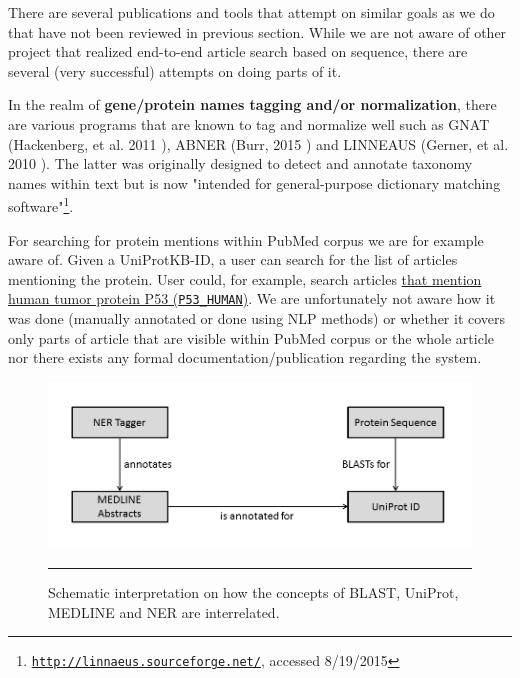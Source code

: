 There are several publications and tools that attempt on similar goals as we do that have not been reviewed in previous section. While we are not aware of other project that realized end-to-end article search based on sequence, there are several (very successful) attempts on doing parts of it.

In the realm of \textbf{gene/protein names tagging and/or normalization}, there are various programs that are known to tag and normalize well such as GNAT (Hackenberg, et al. 2011 \citep{hakenberg2011gnat}), ABNER (Burr, 2015 \citep{settles2005abner}) and LINNEAUS (Gerner, et al. 2010 \citep{gerner2010linnaeus}). The latter was originally designed to detect and annotate taxonomy names within text but is now "intended for general-purpose dictionary matching software"\footnote{\href{http://linnaeus.sourceforge.net/}{\texttt{http://linnaeus.sourceforge.net/}}, accessed 8/19/2015}.

For searching for protein mentions within PubMed corpus we are for example aware of. Given a UniProtKB-ID, a user can search for the list of articles mentioning the protein. User could, for example, search articles \href{http://www.uniprot.org/citationmapping/?query=uniprot:P04637}{that mention human tumor protein P53 (\texttt{P53\_HUMAN})}. We are unfortunately not aware how it was done (manually annotated or done using NLP methods) or whether it covers only parts of article that are visible within PubMed corpus or the whole article nor there exists any formal documentation/publication regarding the system.

\begin{figure}[htbp]
  \centering
    \includegraphics[width=6in]{Figures/component_graph.png}
    \rule{35em}{0.5pt}
  \caption[Schematic interaction between BLAST, UniProt, MEDLINE and NER Tagger]{Schematic interpretation on how the concepts of BLAST, UniProt, MEDLINE and NER are interrelated.}
  \label{fig:SchematicInteraction}
\end{figure}